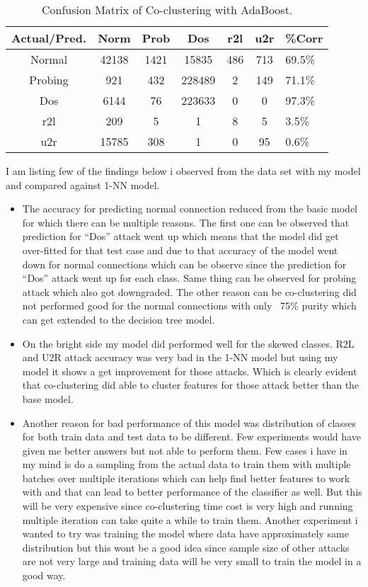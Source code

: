 \documentclass{acm_proc_article-sp}
\begin{document}
\begin{table}
	\centering
	\caption{Confusion Matrix of Co-clustering with AdaBoost.}
	\begin{tabular}{|c|c|c|c|c|c|l|} \hline
		Actual/Pred.&Norm&Prob&Dos&r2l&u2r&\%Corr\\ \hline
		Normal&42138&1421&15835&486&713&69.5\% \\ \hline
		Probing&921&432&228489&2&149&71.1\% \\ \hline
		Dos&6144&76&223633&0&0&97.3\% \\ \hline
		r2l&209&5&1&8&5&3.5\% \\ \hline
		u2r&15785&308&1&0&95&0.6\% \\ \hline
	\end{tabular}
\end{table}

I am listing few of the findings below i observed from the data set with my model and compared against 1-NN model.
\begin{itemize}
	\item The accuracy for predicting normal connection reduced from the basic model for which there can be multiple reasons. The first one can be observed that prediction for ``Dos'' attack went up which means that the model did get over-fitted for that test case and due to that accuracy of the model went down for normal connections which can be observe since the prediction for ``Dos'' attack went up for each class. Same thing can be observed for probing attack which also got downgraded. The other reason can be co-clustering did not performed good for the normal connections with only ~75\% purity which can get extended to the decision tree model.
	\item On the bright side my model did performed well for the skewed classes. R2L and U2R attack accuracy was very bad in the 1-NN model but using my model it shows a get improvement for those attacks. Which is clearly evident that co-clustering did able to cluster features for those attack better than the base model.
	\item Another reason for bad performance of this model was distribution of classes for both train data and test data to be different. Few experiments would have given me better answers but not able to perform them. Few cases i have in my mind is do a sampling from the actual data to train them with multiple batches over multiple iterations which can help find better features to work with and that can lead to better performance of the classifier as well. But this will be very expensive since co-clustering time cost is very high and running multiple iteration can take quite a while to train them. Another experiment i wanted to try was training the model where data have approximately same distribution but this wont be a good idea since sample size of other attacks are not very large and training data will be very small to train the model in a good way.
\end{itemize}
\end{document}
